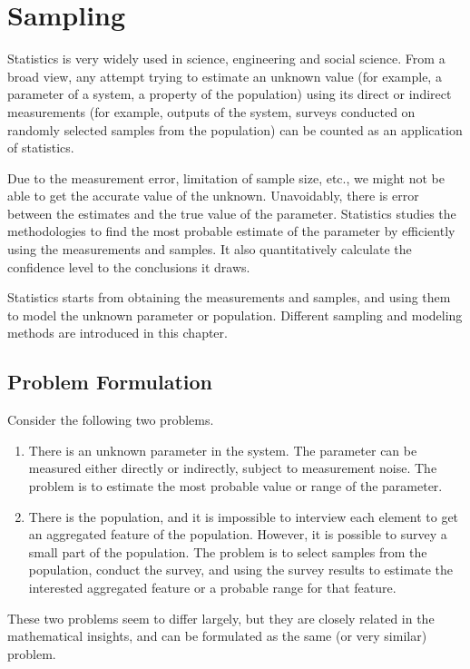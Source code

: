 \chapter{Sampling} \label{ch:sampling}

Statistics is very widely used in science, engineering and social science. From a broad view, any attempt trying to estimate an unknown value (for example, a parameter of a system, a property of the population) using its direct or indirect measurements (for example, outputs of the system, surveys conducted on randomly selected samples from the population) can be counted as an application of statistics.

Due to the measurement error, limitation of sample size, etc., we might not be able to get the accurate value of the unknown. Unavoidably, there is error between the estimates and the true value of the parameter. Statistics studies the methodologies to find the most probable estimate of the parameter by efficiently using the measurements and samples. It also quantitatively calculate the confidence level to the conclusions it draws.

Statistics starts from obtaining the measurements and samples, and using them to model the unknown parameter or population. Different sampling and modeling methods are introduced in this chapter. 

\section{Problem Formulation} \label{sec:statisticsproblemformulation}

Consider the following two problems.
\begin{enumerate}
	\item There is an unknown parameter in the system. The parameter can be measured either directly or indirectly, subject to measurement noise. The problem is to estimate the most probable value or range of the parameter.
	\item There is the population, and it is impossible to interview each element to get an aggregated feature of the population. However, it is possible to survey a small part of the population. The problem is to select samples from the population, conduct the survey, and using the survey results to estimate the interested aggregated feature or a probable range for that feature.
\end{enumerate}
These two problems seem to differ largely, but they are closely related in the mathematical insights, and can be formulated as the same (or very similar) problem. 

